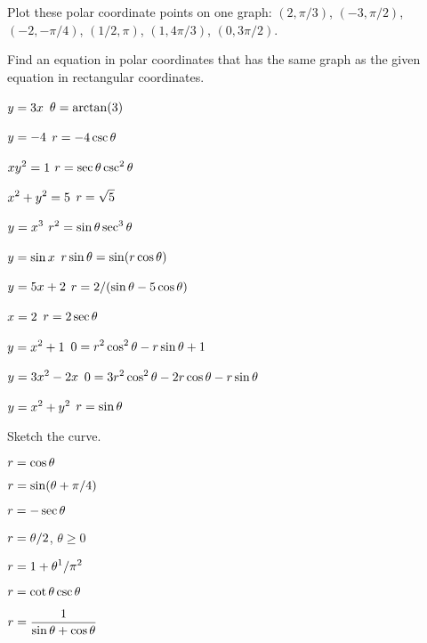 \exercises

\exercise Plot these polar coordinate points on one graph:
$(2,\pi/3)$, $(-3,\pi/2)$, $(-2,-\pi/4)$, $(1/2,\pi)$, $(1,4\pi/3)$, 
$(0,3\pi/2)$.

\noindent Find an equation in polar coordinates that has the same
graph as the given equation in rectangular coordinates.

\twocol
\endexercise

\exercise $\displaystyle y=3x$
\answer $\displaystyle \theta=\arctan(3)$
\endanswer
\endexercise

\exercise $\displaystyle y=-4$
\answer $\displaystyle r=-4\csc\theta$
\endanswer
\endexercise

\exercise $\displaystyle xy^2=1$
\answer $\displaystyle r=\sec\theta\csc^2\theta$
\endanswer
\endexercise

\exercise $\displaystyle x^2+y^2=5$
\answer $\displaystyle r=\sqrt{5}$
\endanswer
\endexercise

\exercise $\displaystyle y=x^3$
\answer $\displaystyle r^2=\sin\theta\sec^3\theta$
\endanswer
\endexercise

\exercise $\displaystyle y=\sin x$
\answer $\displaystyle r\sin\theta=\sin(r\cos\theta)$
\endanswer
\endexercise

\exercise $\displaystyle y=5x+2$
\answer $\displaystyle r=2/(\sin\theta-5\cos\theta)$
\endanswer
\endexercise

\exercise $\displaystyle x=2$
\answer $\displaystyle r=2\sec\theta$
\endanswer
\endexercise

\exercise $\displaystyle y=x^2+1$
\answer $\displaystyle 0=r^2\cos^2\theta-r\sin\theta+1$
\endanswer
\endexercise

\exercise $\displaystyle y=3x^2-2x$
\answer $\displaystyle 0=3r^2\cos^2\theta-2r\cos\theta-r\sin\theta$
\endanswer
\endexercise

\exercise $\displaystyle y=x^2+y^2$
\answer $\displaystyle r=\sin\theta$
\endanswer

\endtwocol
\bsk
\noindent Sketch the curve.
\twocol
\endexercise

\exercise $\displaystyle r=\cos\theta$
\endexercise

\exercise $\displaystyle r=\sin(\theta+\pi/4)$
\endexercise

\exercise $\displaystyle r=-\sec\theta$
\endexercise

\exercise $\displaystyle r=\theta/2$, $\theta\ge0$
\endexercise

\exercise $\displaystyle r=1+\theta^1/\pi^2$
\endexercise

\exercise $\displaystyle r=\cot\theta\csc\theta$
\endexercise

\exercise $\displaystyle r={1\over\sin\theta+\cos\theta}$
\endexercise

